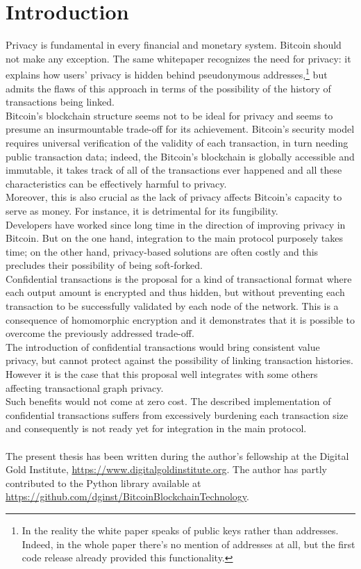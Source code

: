 \chapter{Introduction}
\label{chpr:intro}
Privacy is fundamental in every financial and monetary system.
Bitcoin should not make any exception. The same whitepaper \cite{Nakamoto_bitcoin:a} recognizes the need for privacy: it explains how users' privacy is hidden behind pseudonymous addresses,\footnote{In the reality the white paper speaks of public keys rather than addresses. Indeed, in the whole paper there's no mention of addresses at all, but the first code release already provided this functionality.} but admits the flaws of this approach in terms of the possibility of the history of transactions being linked. \\
Bitcoin's blockchain structure seems not to be ideal for privacy and seems to presume an insurmountable trade-off for its achievement. Bitcoin's security model requires universal verification of the validity of each transaction, in turn needing public transaction data; indeed, the Bitcoin's blockchain is globally accessible and immutable, it takes track of all of the transactions ever happened and all these characteristics can be effectively harmful to privacy. \\
Moreover, this is also crucial as the lack of privacy affects Bitcoin's capacity to serve as money. For instance, it is detrimental for its fungibility.\\
Developers have worked since long time in the direction of improving privacy in Bitcoin. But on the one hand, integration to the main protocol purposely takes time; on the other hand, privacy-based solutions are often costly and this precludes their possibility of being soft-forked.\\
Confidential transactions \cite{Max15} is the proposal for a kind of transactional format where each output amount is encrypted and thus hidden, but without preventing each transaction to be successfully validated by each node of the network. This is a consequence of homomorphic encryption and it demonstrates that it is possible to overcome the previously addressed trade-off.\\
The introduction of confidential transactions would bring consistent value privacy, but cannot protect against the possibility of linking transaction histories. However it is the case that this proposal well integrates with some others affecting transactional graph privacy.\\
Such benefits would not come at zero cost. The described implementation of confidential transactions suffers from excessively burdening each transaction size and consequently is not ready yet for integration in the main protocol.
\\ \ \\
The present thesis has been written during the author's fellowship at the Digital Gold Institute, \url{https://www.digitalgoldinstitute.org}. The author has partly contributed to the Python library available at \url{https://github.com/dginst/BitcoinBlockchainTechnology}.


